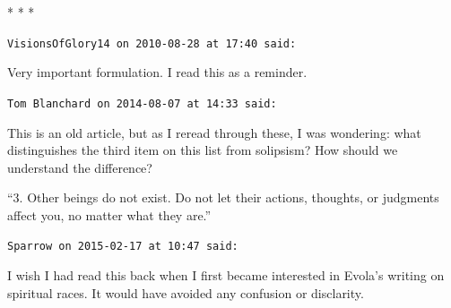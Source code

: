 
\begin{center}* * *\end{center}

\begin{footnotesize}
\begin{sffamily}
\texttt{VisionsOfGlory14 on 2010-08-28 at 17:40 said:}

Very important formulation. I read this as a reminder.

\hfill

\texttt{Tom Blanchard on 2014-08-07 at 14:33 said:}

This is an old article, but as I reread through these, I was wondering: what distinguishes the third item on this list from solipsism? How should we understand the difference?

``3. Other beings do not exist. Do not let their actions, thoughts, or judgments affect you, no matter what they are.''

\hfill

\texttt{Sparrow on 2015-02-17 at 10:47 said:}

I wish I had read this back when I first became interested in Evola's writing on spiritual races. It would have avoided any confusion or disclarity.


\hfill

\end{sffamily}
\end{footnotesize}

